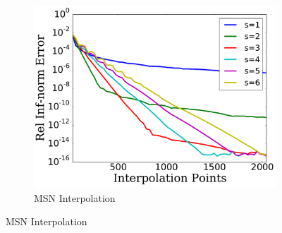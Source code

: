 
\begin{figure}[p]
    \centering
    \begin{subfigure}{0.45\textwidth}
    \includegraphics[width=\textwidth]{plots/msn_interp_fast_2n_rough_sharp_func_2.pdf}
    \caption{MSN Interpolation}
    \end{subfigure}


\end{figure}
